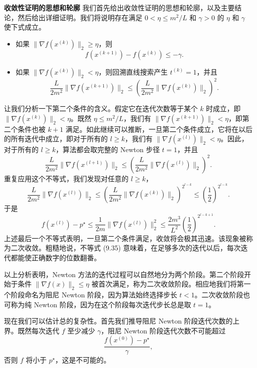 \documentclass[UTF8, 12pt, fontset=fandol, oneside]{ctexart}
\begin{document}
\noindent\textbf{收敛性证明的思想和轮廓}\quad
我们首先给出收敛性证明的思想和轮廓，以及主要结论，然后给出详细证明。我们将说明存在满足 $0<\eta\leq m^2/L$ 和 $\gamma>0$ 的 $\eta$ 和 $\gamma$ 使下式成立。
\begin{itemize}
\item 如果 $\|\nabla f(x^{(k)})\|_2\geq\eta$，则
\begin{equation}
f(x^{(k+1)})-f(x^{(k)})\leq-\gamma.
\tag{9.32}
\end{equation}
\item 如果 $\|\nabla f(x^{(k)})\|_2<\eta$，则回溯直线搜索产生 $t^{(k)}=1$，并且
\begin{equation}
\frac{L}{2m^2}\|\nabla f(x^{(k+1)})\|_2
\leq\left(\frac{L}{2m^2}\|\nabla f(x^{(k)})\|_2\right)^2.
\tag{9.33}
\end{equation}
\end{itemize}

让我们分析一下第二个条件的含义。假定它在迭代次数等于某个 $k$ 时成立，即 $\|\nabla f(x^{(k)})\|_2<\eta$。既然 $\eta\leq m^2/L$，我们有 $\|\nabla f(x^{(k+1)})\|_2<\eta$，即第二个条件也被 $k+1$ 满足。如此继续可以推断，一旦第二个条件成立，它将在以后的所有迭代中成立，即对于所有的 $l\geq k$，我们有 $\|\nabla f(x^{(l)})\|_2<\eta$。因此，对于所有的 $l\geq k$，算法都会取完整的 Newton 步径 $t=1$，并且
\begin{equation}
\frac{L}{2m^2}\|\nabla f(x^{(l+1)})\|_2
\leq\left(\frac{L}{2m^2}\|\nabla f(x^{(l)})\|_2\right)^2.
\tag{9.34}
\end{equation}
重复应用这个不等式，我们发现对任意的 $l\geq k$，
\[
\frac{L}{2m^2}\|\nabla f(x^{(l)})\|_2
\leq\left(\frac{L}{2m^2}\|\nabla f(x^{(k)})\|_2\right)^{2^{l-k}}
\leq\left(\frac{1}{2}\right)^{2^{l-k}}.
\]
于是
\begin{equation}
f(x^{(l)})-p^\star
\leq\frac{1}{2m}\|\nabla f(x^{(l)})\|_2^2
\leq\frac{2m^3}{L^2}\left(\frac{1}{2}\right)^{2^{l-k+1}}.
\tag{9.35}
\end{equation}
上述最后一个不等式表明，一旦第二个条件满足，收敛将会极其迅速。该现象被称为二次收敛。粗糙地说，不等式 (9.35) 意味着，在足够多次的迭代以后，每次迭代都能使正确数字的位数翻番。

以上分析表明，Newton 方法的迭代过程可以自然地分为两个阶段。第二个阶段开始于条件 $\|\nabla f(x)\|_2\leq\eta$ 被首次满足，称为二次收敛阶段。相应地我们将第一个阶段命名为阻尼 Newton 阶段，因为算法始终选择步长 $t<1$。二次收敛阶段也可称为纯 Newton 阶段，因为在这个阶段每次迭代步长总是取 $t=1$。

现在我们可以估计总的复杂性。首先我们推导阻尼 Newton 阶段迭代次数的上界。既然每次迭代 $f$ 至少减少 $\gamma$，阻尼 Newton 阶段迭代次数不可能超过
\[
\frac{f(x^{(0)})-p^\star}{\gamma},
\]
否则 $f$ 将小于 $p^\star$，这是不可能的。
\end{document}
